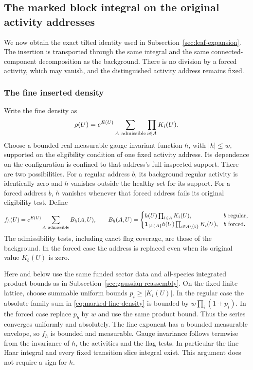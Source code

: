 \subsection{The marked block integral on the original activity addresses}
\label{sec:marked-block-integral}
We now obtain the exact tilted identity used in
Subsection~\ref{sec:leaf-expansion}. The insertion is transported through
the same integral and the same connected-component decomposition as
the background. There is no division by a forced activity, which may
vanish, and the distinguished activity address remains fixed.

\subsubsection{The fine inserted density}
Write the fine density as
\[
 \rho(U)=e^{E(U)}\sum_{A\ {\rm admissible}}\prod_{i\in A}K_i(U).
\]
Choose a bounded real measurable gauge-invariant function $h$, with
$|h|\le w$, supported on the eligibility condition of one fixed
activity address. Its dependence on the configuration is confined to
that address's full inspected support. There are two possibilities.
For a regular address $b$, its background regular activity is
identically zero and $h$ vanishes outside the healthy set for its
support. For a forced address $b$, $h$ vanishes whenever that forced
address fails its original eligibility test. Define
\begin{equation}\label{eq:marked-fine-density}
 f_h(U)=e^{E(U)}\sum_{A\ {\rm admissible}} B_h(A,U),\qquad
 B_h(A,U)=
 \begin{cases}
 h(U)\prod_{i\in A}K_i(U),&b\text{ regular},\\
 \mathbf1_{\{b\in A\}}h(U)\prod_{i\in A\setminus\{b\}}K_i(U),
                                      &b\text{ forced}.
 \end{cases}
\end{equation}
The admissibility tests, including exact flag coverage, are those
of the background. In the forced case the address is replaced even
when its original value $K_b(U)$ is zero.

Here and below use the same funded sector data and all-species
integrated product bounds as in
Subsection~\ref{sec:gaussian-reassembly}. On the fixed finite lattice,
choose summable uniform bounds $p_i\ge|K_i(U)|$. In the regular case
the absolute family sum in \eqref{eq:marked-fine-density} is bounded by
$w\prod_i(1+p_i)$. In the forced case replace $p_b$ by $w$ and use
the same product bound. Thus the series converges uniformly and
absolutely. The fine exponent has a bounded measurable envelope, so
$f_h$ is bounded and measurable. Gauge invariance follows termwise
from the invariance of $h$, the activities and the flag tests.
In particular the fine Haar integral and every fixed transition
slice integral exist. This argument does not require a sign for $h$.

